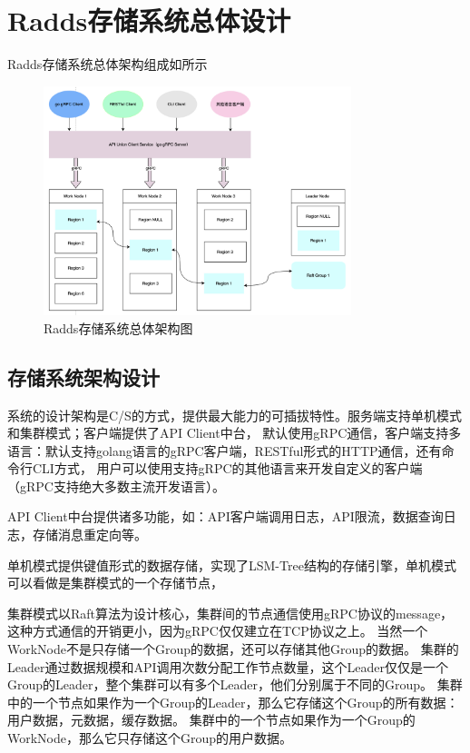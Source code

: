 \section{Radds存储系统总体设计}

	Radds存储系统总体架构组成如所示
	
	\begin{figure}[H]
		\centering
		\includegraphics[width=0.80\textwidth]{images/radds_system_arch}
		\caption{Radds存储系统总体架构图}
		\label{overall_structure}
	\end{figure}
	
	\subsection{存储系统架构设计}

		系统的设计架构是C/S的方式，提供最大能力的可插拔特性。服务端支持单机模式和集群模式；客户端提供了API Client中台，
		默认使用gRPC通信，客户端支持多语言：默认支持golang语言的gRPC客户端，RESTful形式的HTTP通信，还有命令行CLI方式，
		用户可以使用支持gRPC的其他语言来开发自定义的客户端（gRPC支持绝大多数主流开发语言）。
		
		API Client中台提供诸多功能，如：API客户端调用日志，API限流，数据查询日志，存储消息重定向等。

		单机模式提供键值形式的数据存储，实现了LSM-Tree结构的存储引擎，单机模式可以看做是集群模式的一个存储节点，
		
		集群模式以Raft算法为设计核心，集群间的节点通信使用gRPC协议的message，这种方式通信的开销更小，因为gRPC仅仅建立在TCP协议之上。
		当然一个WorkNode不是只存储一个Group的数据，还可以存储其他Group的数据。
		集群的Leader通过数据规模和API调用次数分配工作节点数量，这个Leader仅仅是一个Group的Leader，整个集群可以有多个Leader，他们分别属于不同的Group。
		集群中的一个节点如果作为一个Group的Leader，那么它存储这个Group的所有数据：用户数据，元数据，缓存数据。
		集群中的一个节点如果作为一个Group的WorkNode，那么它只存储这个Group的用户数据。
		
